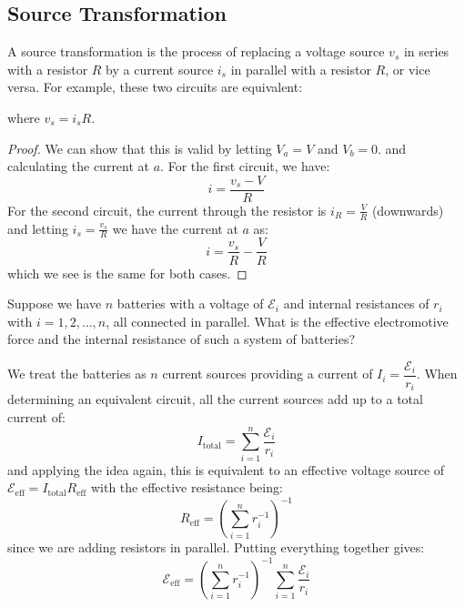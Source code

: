 \documentclass{article}
\begin{document}
    \subsection{Source Transformation}
    A source transformation is the process of replacing a voltage source $v_s$ in series with a resistor $R$ by a current source $i_s$ in parallel with a resistor $R$, or vice versa. For example, these two circuits are equivalent:
    \begin{center}
    \end{center}
    where $v_s=i_sR$.
    \begin{proof}
        We can show that this is valid by letting $V_a=V$ and $V_b=0$. and calculating the current at $a$. For the first circuit, we have:
        \begin{equation}
            i = \frac{v_s-V}{R}
        \end{equation}
        For the second circuit, the current through the resistor is $i_R = \frac{V}{R}$ (downwards) and letting $i_s = \frac{v_s}{R}$ we have the current at $a$ as:
        \begin{equation}
            i = \frac{v_s}{R} - \frac{V}{R}
        \end{equation}
        which we see is the same for both cases.
    \end{proof}
    \begin{example}
        Suppose we have $n$ batteries with a voltage of $\mathcal{E}_i$ and internal resistances of $r_i$ with $i=1,2,\dots,n$, all connected in parallel. What is the effective electromotive force and the internal resistance of such a system of batteries?
        \vspace{2mm}

        We treat the batteries as $n$ current sources providing a current of $I_i = \dfrac{\mathcal{E}_i}{r_i}$. When determining an equivalent circuit, all the current sources add up to a total current of:
$$I_\text{total} = \sum_{i=1}^n \frac{\mathcal{E}_i}{r_i}$$and applying the idea again, this is equivalent to an effective voltage source of $\mathcal{E}_\text{eff} = I_\text{total}R_\text{eff}$ with the effective resistance being:
$$R_\text{eff} = \left(\sum_{i=1}^nr_i^{-1}\right)^{-1}$$since we are adding resistors in parallel. Putting everything together gives:
$$\mathcal{E}_\text{eff} = \left(\sum_{i=1}^nr_i^{-1}\right)^{-1}\sum_{i=1}^n \frac{\mathcal{E}_i}{r_i}$$
\end{example}
\end{document}
